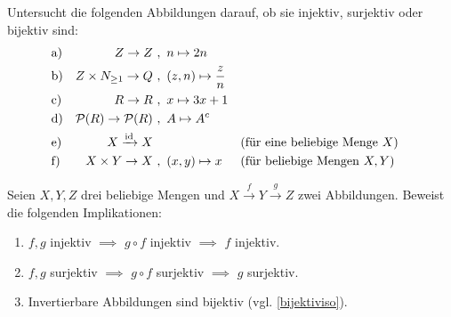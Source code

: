\begin{aufg} \label{aufg:insurbi}
    Untersucht die folgenden Abbildungen darauf, ob sie injektiv, surjektiv oder bijektiv sind:
    \begin{align*}
        & \text{a)} & \relax Z \to \relax Z\ &,\ n\mapsto 2n \\
        & \text{b)} & \relax Z \times \relax N_{\ge 1} \to \relax Q\ &,\ (z,n) \mapsto \frac{z}{n} \\
        & \text{c)} & \relax R \to \relax R\ &,\ x\mapsto 3x+1 \\
        & \text{d)} & \mathcal P(\relax R) \to \mathcal P(\relax R) \ &,\ A \mapsto A^c \\
        & \text{e)} & X\xrightarrow{\mathrm{id}} X\ & && (\text{für eine beliebige Menge $X$}) \\
        & \text{f)} & X\times Y \to X \ &,\ (x,y) \mapsto x && (\text{für beliebige Mengen $X,Y$})
    \end{align*}
\end{aufg}


\begin{aufg} \label{aufg:bijektiviso}
    Seien $X,Y,Z$ drei beliebige Mengen und $X \xrightarrow{f} Y \xrightarrow{g} Z$ zwei Abbildungen. Beweist die folgenden Implikationen:
    \begin{enumerate}
        \item $f,g$ injektiv $\implies$ $g\circ f$ injektiv $\implies$ $f$ injektiv.
        \item $f,g$ surjektiv $\implies$ $g\circ f$ surjektiv $\implies$ $g$ surjektiv.
        \item Invertierbare Abbildungen sind bijektiv (vgl. \cref{bijektiviso}).
    \end{enumerate}
\end{aufg}

